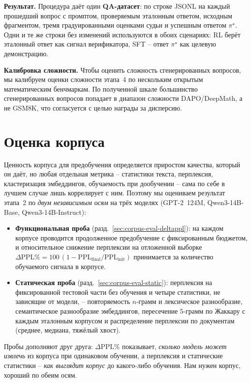 \documentclass{article}
\begin{document}
\textbf{Результат.}
Процедура даёт один \textbf{QA-датасет}: по строке JSONL на каждый прошедший вопрос с промптом, проверяемым эталонным ответом, исходным фрагментом, тремя градуированными оценками судьи и успешным ответом $\pi^\star$. Одни и те же строки без изменений используются в обоих сценариях: RL берёт эталонный ответ как сигнал верификатора, SFT -- ответ $\pi^\star$ как целевую демонстрацию.

\textbf{Калибровка сложности.}
Чтобы оценить сложность сгенерированных вопросов, мы калибруем оценки сложности этапа~4 по нескольким открытым математическим бенчмаркам. По полученной шкале большинство сгенерированных вопросов попадает в диапазон сложности DAPO/DeepMath, а не GSM8K, что согласуется с целью награды за дисперсию.

\section{Оценка корпуса}\label{sec:corpus-eval}

Ценность корпуса для предобучения определяется приростом качества, который он даёт, но любая отдельная метрика -- статистики текста, перплексия, кластеризация эмбеддингов, обучаемость при дообучении -- сама по себе в лучшем случае лишь коррелирует с ним. Поэтому мы оцениваем результат этапа~2 по \emph{двум независимым осям} на трёх моделях (GPT-2~124M, Qwen3-14B-Base, Qwen3-14B-Instruct):

\begin{itemize}
  \item \textbf{Функциональная проба} (разд.~\ref{sec:corpus-eval-deltappl}): на каждом корпусе проводится продолженное предобучение с фиксированным бюджетом, и относительное снижение перплексии на отложенной выборке $\Delta\mathrm{PPL}\% = 100\,(1 - \mathrm{PPL}_{\text{final}}/\mathrm{PPL}_{\text{init}})$ принимается за количество обучаемого сигнала в корпусе.
  \item \textbf{Статическая проба} (разд.~\ref{sec:corpus-eval-static}): перплексия на фиксированной тестовой части без обучения и четыре статистики, не зависящие от модели, -- повторяемость $n$-грамм и лексическое разнообразие, семантическое разнообразие эмбеддингов, пересечение $5$-грамм по Жаккару с каждым эталонным корпусом и распределение перплексии по документам (среднее, медиана, тяжёлый хвост).
\end{itemize}

Пробы дополняют друг друга: $\Delta\mathrm{PPL}\%$ показывает, \emph{сколько модель может извлечь} из корпуса при одинаковом обучении, а перплексия и статические статистики -- \emph{как выглядит корпус} до какого-либо обучения. Нам нужен корпус, хороший по обеим осям.
\end{document}
